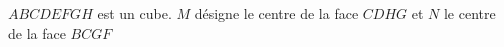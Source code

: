 
%
$ABCDEFGH$ est un cube. $M$ désigne le centre de la face $CDHG$ et $N$ le centre de la face $BCGF$
